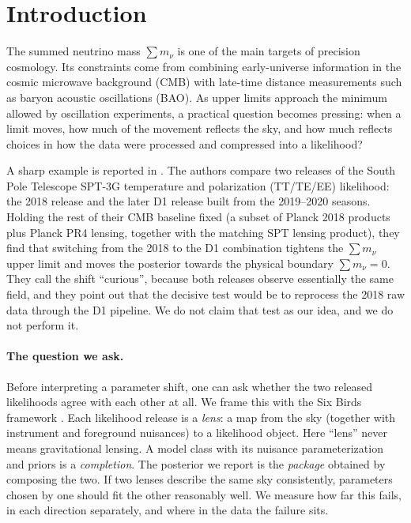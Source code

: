 \documentclass[11pt]{article}
\theoremstyle{remark}
\newcommand{\mnu}{\sum m_\nu}
\numberwithin{equation}{section}
\begin{document}
\section{Introduction}
\label{sec:intro}

The summed neutrino mass $\mnu$ is one of the main targets of precision cosmology. Its constraints come from combining early-universe information in the cosmic microwave background (CMB) with late-time distance measurements such as baryon acoustic oscillations (BAO). As upper limits approach the minimum allowed by oscillation experiments, a practical question becomes pressing: when a limit moves, how much of the movement reflects the sky, and how much reflects choices in how the data were processed and compressed into a likelihood?

A sharp example is reported in \cite{arxiv2601_16277}. The authors compare two releases of the South Pole Telescope SPT-3G temperature and polarization (TT/TE/EE) likelihood: the 2018 release and the later D1 release built from the 2019--2020 seasons. Holding the rest of their CMB baseline fixed (a subset of Planck 2018 products plus Planck PR4 lensing, together with the matching SPT lensing product), they find that switching from the 2018 to the D1 combination tightens the $\mnu$ upper limit and moves the posterior towards the physical boundary $\mnu=0$. They call the shift ``curious'', because both releases observe essentially the same field, and they point out that the decisive test would be to reprocess the 2018 raw data through the D1 pipeline. We do not claim that test as our idea, and we do not perform it.

\paragraph{The question we ask.}
Before interpreting a parameter shift, one can ask whether the two released likelihoods agree with each other at all. We frame this with the Six Birds framework \cite{sixbirds_foundations,sixbirds_darkenergy}. Each likelihood release is a \emph{lens}: a map from the sky (together with instrument and foreground nuisances) to a likelihood object. Here ``lens'' never means gravitational lensing. A model class with its nuisance parameterization and priors is a \emph{completion}. The posterior we report is the \emph{package} obtained by composing the two. If two lenses describe the same sky consistently, parameters chosen by one should fit the other reasonably well. We measure how far this fails, in each direction separately, and where in the data the failure sits.
\end{document}
